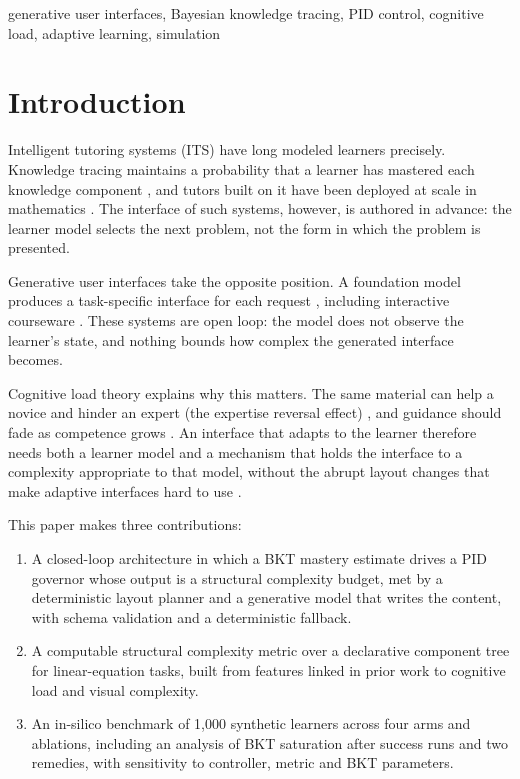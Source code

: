 \documentclass[conference]{IEEEtran}
\begin{document}
\begin{IEEEkeywords}
generative user interfaces, Bayesian knowledge tracing, PID control,
cognitive load, adaptive learning, simulation
\end{IEEEkeywords}

\section{Introduction}

Intelligent tutoring systems (ITS) have long modeled learners precisely.
Knowledge tracing maintains a probability that a learner has mastered each
knowledge component \cite{corbett1995knowledge}, and
tutors built on it have been deployed at scale in mathematics
\cite{ritter2007cognitive,vanlehn2011relative}. The interface of such
systems, however, is authored in advance: the learner model selects the next
problem, not the form in which the problem is presented.

Generative user interfaces take the opposite position. A foundation model
produces a task-specific interface for each request
\cite{leviathan2026genui}, including interactive courseware
\cite{tu2026maicui}. These systems are open loop: the model does not observe
the learner's state, and nothing bounds how complex the generated interface
becomes.

Cognitive load theory explains why this matters. The same material can help
a novice and hinder an expert (the expertise reversal effect)
\cite{kalyuga2003expertise}, and guidance should fade as
competence grows \cite{renkl2003structuring,salden2010expertise}. An
interface that adapts to the learner therefore needs both a learner model and
a mechanism that holds the interface to a complexity appropriate to that
model, without the abrupt layout changes that make adaptive interfaces hard
to use \cite{gajos2008predictability,findlater2004menus}.

This paper makes three contributions:
\begin{enumerate}
\item A closed-loop architecture in which a BKT mastery estimate drives a PID
governor whose output is a structural complexity budget, met by a
deterministic layout planner and a generative model that writes the content,
with schema validation and a deterministic fallback.
\item A computable structural complexity metric over a declarative component
tree for linear-equation tasks, built from features linked in prior work to
cognitive load and visual complexity.
\item An in-silico benchmark of 1,000 synthetic learners across four arms
and ablations, including an analysis of BKT saturation after success runs
and two remedies, with sensitivity to controller, metric and BKT parameters.
\end{enumerate}
\end{document}

